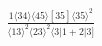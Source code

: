 \documentclass[varwidth, border=5pt]{standalone}
\begin{document}
\begin{my}
$\begin{gathered}
\scriptscriptstyle\frac{1⟨34⟩⟨45⟩[35]⟨35⟩^2}{⟨13⟩^2⟨23⟩^2⟨3|1+2|3]}
\end{gathered}$
\end{my}
\end{document}
